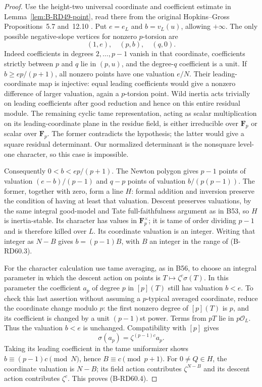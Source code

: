 \begin{proof}
Use the height-two universal coordinate and coefficient estimate
in Lemma~\ref{lem:B-RD49-point}, read there from the original
Hopkins--Gross Propositions~5.7 and~12.10
\cite[Proposition~5.7, equations (12.3)--(12.5), and
Proposition~12.10 with proof]{HopkinsGross1994Bundles}. Put $e=e_L$ and
$b=v_L(u)$, allowing $+\infty$. The only possible negative-slope
vertices for nonzero $p$-torsion are
\[
                        (1,e),\quad(p,b),\quad(q,0).
\]
Indeed coefficients in degrees $2,\ldots,p-1$ vanish in that
coordinate, coefficients strictly between $p$ and $q$ lie in
$(p,u)$, and the degree-$q$ coefficient is a unit.
If $b\ge ep/(p+1)$, all nonzero points have one valuation $e/N$.
Their leading-coordinate map is injective: equal leading
coefficients would give a nonzero difference of larger valuation,
again a $p$-torsion point. Wild inertia acts trivially on leading
coefficients after good reduction and hence on this entire residual
module. The remaining cyclic tame representation, acting as scalar
multiplication on its leading-coordinate plane in the residue field,
is either irreducible over $\mathbf F_p$ or scalar over
$\mathbf F_p$. The former contradicts the hypothesis; the latter
would give a square residual determinant. Our normalized determinant
is the nonsquare level-one character, so this case is impossible.

Consequently $0<b<ep/(p+1)$. The Newton polygon gives $p-1$ points
of valuation $(e-b)/(p-1)$ and $q-p$ points of valuation
$b/(p(p-1))$. The former, together with zero, form a line $H$:
formal addition and inversion preserve the condition of having at
least that valuation. Descent preserves valuations, by the same
integral good-model and Tate full-faithfulness argument as in B53,
so $H$ is inertia-stable. Its character has values in
$\mathbf F_p^\times$; it is tame of order dividing $p-1$ and is
therefore killed over $L$. Its coordinate valuation is an integer.
Writing that integer as $N-B$ gives $b=(p-1)B$, with $B$ an integer
in the range of (B-RD60.3).

For the character calculation use tame averaging, as in B56, to
choose an integral parameter in which the descent action on points
is $T\mapsto\zeta^c\sigma(T)$. In this parameter the coefficient
$a_p$ of degree $p$ in $[p](T)$ still has valuation $b<e$.
To check this last assertion without assuming a $p$-typical averaged
coordinate, reduce the coordinate change modulo $p$: the first
nonzero degree of $[p](T)$ is $p$, and its coefficient is changed
by a unit $(p-1)$st power. Terms from $pT$ lie in $p\mathcal O_L$.
Thus the valuation $b<e$ is unchanged. Compatibility with $[p]$
gives
\[
                  \sigma(a_p)=\zeta^{(p-1)c}a_p.
\]
Taking its leading coefficient in the tame uniformizer shows
$b\equiv(p-1)c\pmod N$, hence $B\equiv c\pmod{p+1}$.
For $0\ne Q\in H$, the coordinate valuation is $N-B$;
its field action contributes $\zeta^{N-B}$ and its descent action
contributes $\zeta^c$. This proves (B-RD60.4).


\end{proof}
